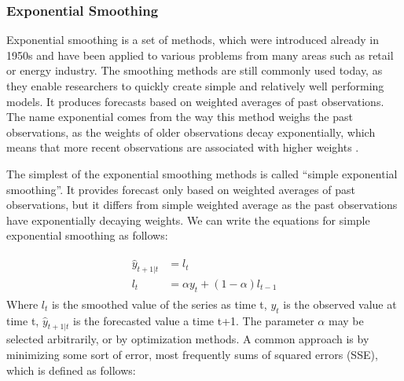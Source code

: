 \documentclass[11pt,a4paper]{article}
\begin{document}
\subsubsection{Exponential Smoothing}
\label{intro_exp}
Exponential smoothing is a set of methods, which were introduced already in 1950s \cite{brown1957exponential} and have been applied to various problems from many areas such as retail or energy industry. The smoothing methods are still commonly used today, as they enable researchers to quickly create simple and relatively well performing models.  It produces forecasts based on weighted averages of past observations. The name exponential comes from the way this method weighs the past observations, as the weights of older observations decay exponentially, which means that more recent observations are associated with higher weights \cite{hyndman2014forecasting}. 

The simplest of the exponential smoothing methods is called ``simple exponential smoothing''. It provides forecast only based on weighted averages of past observations, but it differs from simple weighted average as the past observations have exponentially decaying weights. We can write the equations for simple exponential smoothing as follows:

\begin{equation}
\begin{gathered}
\begin{aligned}
\hat{y}_{t+1|t} &= l_t \\
l_t &= \alpha y_t + (1-\alpha)l_{t-1}
\end{aligned}
\end{gathered}
\end{equation}
Where $l_t$ is the smoothed value of the series as time t, $y_t$ is the observed value at time t, $\hat{y}_{t+1|t}$ is the forecasted value a time t+1. The parameter $\alpha$ may be selected arbitrarily, or by optimization methods. A common approach is by minimizing some sort of error, most frequently sums of squared errors (SSE), which is defined as follows:
\end{document}
